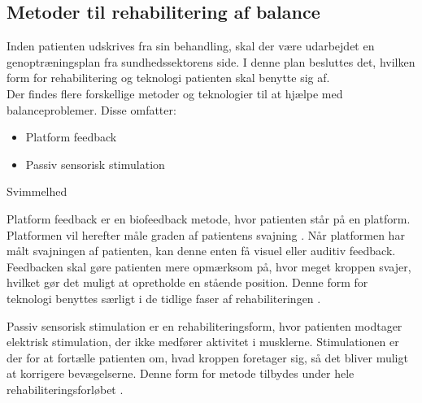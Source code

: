 \subsection{Metoder til rehabilitering af balance}

Inden patienten udskrives fra sin behandling, skal der være udarbejdet en genoptræningsplan fra sundhedssektorens side. I denne plan besluttes det, hvilken form for rehabilitering og teknologi patienten skal benytte sig af. \cite{Sundhedsstyrelsen2011a} \\
Der findes flere forskellige metoder og teknologier til at hjælpe med balanceproblemer. Disse omfatter: \cite{Sundhedsstyrelsen2011a}  

\begin{itemize}
\item Platform feedback
\item Passiv sensorisk stimulation
\end{itemize}

Svimmelhed

Platform feedback er en biofeedback metode, hvor patienten står på en platform. Platformen vil herefter måle graden af patientens svajning . Når platformen har målt svajningen af patienten, kan denne enten få visuel eller auditiv feedback. Feedbacken skal gøre patienten mere opmærksom på, hvor meget kroppen svajer, hvilket gør det muligt at opretholde en stående position. \cite{Barclay-Goddard2004}
Denne form for teknologi benyttes særligt i de tidlige faser af rehabiliteringen \cite{Sundhedsstyrelsen2011a}. 

Passiv sensorisk stimulation er en rehabiliteringsform, hvor patienten modtager elektrisk stimulation, der ikke medfører aktivitet i musklerne. Stimulationen er der for at fortælle patienten om, hvad kroppen foretager sig, så det bliver muligt at korrigere bevægelserne. \cite{Sundhedsstyrelsen2010} Denne form for metode tilbydes under hele rehabiliteringsforløbet \cite{Sundhedsstyrelsen2011a}.